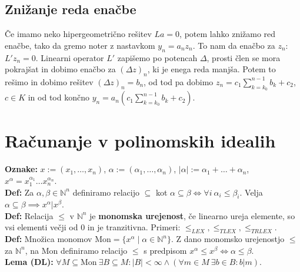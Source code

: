 \documentclass[a4paper,oneside,10pt]{article}
\theoremstyle{definition}
\newcommand{\N}{\ensuremath{\mathbb{N}}}
\newcommand{\Mon}{\ensuremath{\textrm{Mon}}}
\let\oldtextbf\textbf
\renewcommand{\textbf}[1]{\oldtextbf{\boldmath #1}}
\begin{document}
\subsection*{Znižanje reda enačbe}
Če imamo neko hipergeometrično rešitev $La = 0$, potem lahko znižamo red enačbe, tako da gremo noter z nastavkom $y_n = a_n z_n$. To nam da enačbo za $z_n$: $L'z_n = 0$. Linearni operator $L'$ zapišemo po potencah $\Delta$, prosti člen se mora pokrajšat in dobimo enačbo za $(\Delta z)_n$, ki je enega reda manjša. Potem to rešimo in dobimo rešitev $(\Delta z)_n = b_n$, od tod pa dobimo $z_n = c_1 \sum_{k=k_0}^{n-1} b_k + c_2$, $c \in K$ in od tod končno $y_n = a_n (c_1 \sum_{k=k_0}^{n-1} b_k + c_2)$.

\newpage

\section*{Računanje v polinomskih idealih}

\textbf{Oznake:} $x := (x_1, \ldots, x_n)$, $\alpha := (\alpha_1, \ldots, \alpha_n)$, $|\alpha| := \alpha_1 + \ldots + \alpha_n$, $x^\alpha = x_1^{\alpha_1}\ldots x_n^{\alpha_n}$.\\
\textbf{Def:} Za $\alpha, \beta \in \N^n$ definiramo relacijo $\subseteq$ kot $\alpha \subseteq \beta \iff \forall i \ \alpha_i \leq \beta_i$. Velja $\alpha \subseteq \beta \implies x^\alpha | x^\beta$.\\
\textbf{Def:} Relacija $\leq$ v $\N^n$ je \textbf{monomska urejenost}, če linearno ureja elemente, so vsi elementi večji od 0 in je tranzitivna. Primeri: $\leq_{LEX}, \leq_{TLEX}, \leq_{TRLEX}$. \\
\textbf{Def:} Množica monomov $\Mon = \{x^\alpha \mid \alpha \in \N^n\}$. Z dano monomsko urejenostjo $\leq$ za $\N^n$, na $\Mon$ definiramo relacijo $\leq$ s predpisom $x^\alpha \leq x^\beta \iff \alpha \leq \beta$. \\
\textbf{Lema (DL):} $\forall M \subseteq \Mon \ \exists B \subseteq M \colon |B| < \infty \land (\forall m \in M \ \exists b \in B\colon b|m)$.
\end{document}
